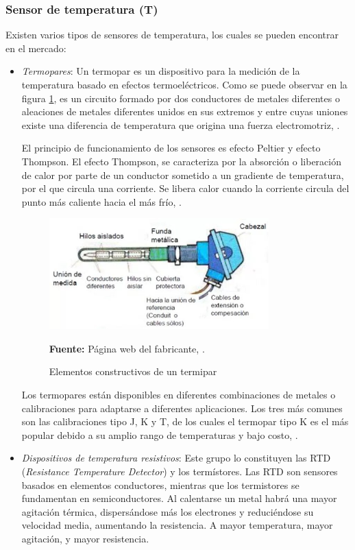 \subsubsection{Sensor de temperatura (T)}
Existen varios tipos de sensores de temperatura, los cuales se pueden encontrar en el mercado: 
\begin{itemize}
    \item \textit{Termopares}: Un  termopar  es  un  dispositivo  para  la  medición  de  la  temperatura  basado  en  efectos  termoeléctricos.  Como se puede observar en la figura \ref{fig:Termopar}, es  un  circuito   formado   por   dos   conductores   de   metales   diferentes  o  aleaciones  de  metales  diferentes  unidos  en  sus extremos y entre cuyas uniones existe una diferencia de temperatura que origina una fuerza electromotriz, \cite{rodriguez_medicion_2007}. 
   
    El principio de funcionamiento de los sensores es efecto Peltier y efecto Thompson. El  efecto  Thompson,  se  caracteriza  por  la  absorci\'on  o  liberaci\'on de calor por parte de un conductor sometido a un  gradiente  de  temperatura,  por  el  que  circula  una  corriente.    Se  libera  calor  cuando  la  corriente  circula  del  punto m\'as caliente hacia el m\'as fr\'io, \cite{logvinov_principios_2007}.
    
    \begin{figure}[ht]
        \centering
        \includegraphics[width=0.8\textwidth]{Imagenes/cap2/termopar.jpg}
        \bigskip
        \caption{Elementos constructivos de un termipar}  \textbf{Fuente:} P\'agina web del fabricante, \cite{universidad_de_carabobo_-termopares_nodate}.
        \label{fig:Termopar}
    \end{figure}
    Los termopares están disponibles en diferentes combinaciones de metales o calibraciones para adaptarse a diferentes aplicaciones. Los tres más comunes son las calibraciones tipo J, K y T, de los cuales el termopar tipo K es el más popular debido a su amplio rango de temperaturas y bajo costo, \cite{omega_termopar_nodate}.
    \item \textit{Dispositivos de temperatura resistivos}: Este    grupo    lo    constituyen    las    RTD    (\textit{Resistance    Temperature  Detector})  y  los  term\'istores.  Las  RTD  son  sensores basados en elementos conductores, mientras que los termistores se fundamentan en semiconductores.
    Al calentarse un metal habrá una mayor agitación térmica, dispersándose más los electrones y reduciéndose su velocidad media, aumentando la resistencia. A mayor temperatura, mayor agitación, y mayor resistencia.
    

\end{itemize}
